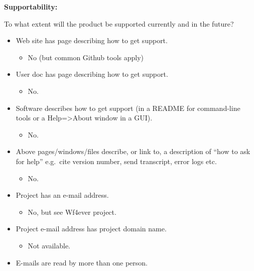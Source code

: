 \textbf{Supportability:}

To what extent will the product be supported currently and in the
future?

\begin{itemize}
\itemsep1pt\parskip0pt
\item
  Web site has page describing how to get support.

  \begin{itemize}
  \itemsep1pt\parskip0pt
  \item
    No (but common Github tools apply)
  \end{itemize}
\item
  User doc has page describing how to get support.

  \begin{itemize}
  \itemsep1pt\parskip0pt
  \item
    No.
  \end{itemize}
\item
  Software describes how to get support (in a README for command-line
  tools or a Help=\textgreater{}About window in a GUI).

  \begin{itemize}
  \itemsep1pt\parskip0pt
  \item
    No.
  \end{itemize}
\item
  Above pages/windows/files describe, or link to, a description of ``how
  to ask for help'' e.g.~cite version number, send transcript, error
  logs etc.

  \begin{itemize}
  \itemsep1pt\parskip0pt
  \item
    No.
  \end{itemize}
\item
  Project has an e-mail address.

  \begin{itemize}
  \itemsep1pt\parskip0pt
  \item
    No, but see Wf4ever project.
  \end{itemize}
\item
  Project e-mail address has project domain name.

  \begin{itemize}
  \itemsep1pt\parskip0pt
  \item
    Not available.
  \end{itemize}
\item
  E-mails are read by more than one person.


\end{itemize}
